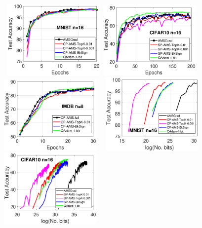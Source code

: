 \documentclass[11pt]{article}
\begin{document}
\begin{figure}[H]
    \begin{center}
    \mbox{\hspace{-0.1in}
        \includegraphics[width=1.95in]{fig/mnist_cnn_test_accuracy_16_Qadamsign.eps}\hspace{-0.1in}
        \includegraphics[width=1.95in]{fig/cifar_lenet_test_accuracy_16_Qadamsign.eps}
        \hspace{-0.1in}
        \includegraphics[width=1.95in]{fig/imbd_lstm_test_accuracy_8_Qadamsign.eps}
    }
    \mbox{\hspace{-0.1in}
        \includegraphics[width=1.95in]{fig/mnist_cnn_test_accuracy_16_vs_bits_Qadamsign.eps}\hspace{-0.1in}
        \includegraphics[width=1.95in]{fig/cifar_lenet_test_accuracy_16_vs_bits_Qadamsign.eps}
}
\end{center}
\end{figure}
\end{document}
